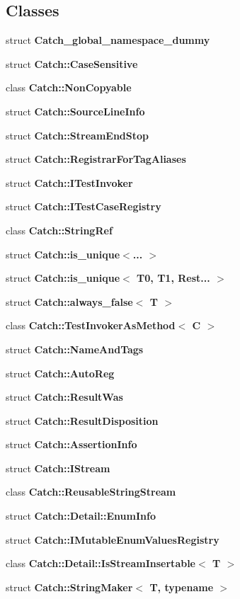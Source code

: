 \subsection*{Classes}
\begin{DoxyCompactItemize}
\item 
struct \textbf{ Catch\+\_\+global\+\_\+namespace\+\_\+dummy}
\item 
struct \textbf{ Catch\+::\+Case\+Sensitive}
\item 
class \textbf{ Catch\+::\+Non\+Copyable}
\item 
struct \textbf{ Catch\+::\+Source\+Line\+Info}
\item 
struct \textbf{ Catch\+::\+Stream\+End\+Stop}
\item 
struct \textbf{ Catch\+::\+Registrar\+For\+Tag\+Aliases}
\item 
struct \textbf{ Catch\+::\+I\+Test\+Invoker}
\item 
struct \textbf{ Catch\+::\+I\+Test\+Case\+Registry}
\item 
class \textbf{ Catch\+::\+String\+Ref}
\item 
struct \textbf{ Catch\+::is\+\_\+unique$<$... $>$}
\item 
struct \textbf{ Catch\+::is\+\_\+unique$<$ T0, T1, Rest... $>$}
\item 
struct \textbf{ Catch\+::always\+\_\+false$<$ T $>$}
\item 
class \textbf{ Catch\+::\+Test\+Invoker\+As\+Method$<$ C $>$}
\item 
struct \textbf{ Catch\+::\+Name\+And\+Tags}
\item 
struct \textbf{ Catch\+::\+Auto\+Reg}
\item 
struct \textbf{ Catch\+::\+Result\+Was}
\item 
struct \textbf{ Catch\+::\+Result\+Disposition}
\item 
struct \textbf{ Catch\+::\+Assertion\+Info}
\item 
struct \textbf{ Catch\+::\+I\+Stream}
\item 
class \textbf{ Catch\+::\+Reusable\+String\+Stream}
\item 
struct \textbf{ Catch\+::\+Detail\+::\+Enum\+Info}
\item 
struct \textbf{ Catch\+::\+I\+Mutable\+Enum\+Values\+Registry}
\item 
class \textbf{ Catch\+::\+Detail\+::\+Is\+Stream\+Insertable$<$ T $>$}
\item 
struct \textbf{ Catch\+::\+String\+Maker$<$ T, typename $>$}
\item 

\end{DoxyCompactItemize}
